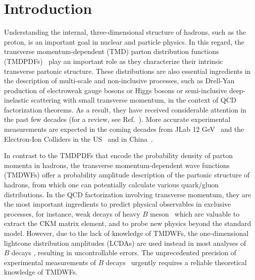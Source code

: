 \documentclass[prd,aps,twocolumn,preprintnumbers, showpacs, nofootinbib,superscriptaddress,notitlepage]{revtex4-1}
\begin{document}
\maketitle
\section{Introduction}

Understanding the internal, three-dimensional structure of hadrons, such as the proton, is an important goal in nuclear and particle physics. In this regard, the transverse momentum-dependent (TMD) parton distribution functions (TMDPDFs)~\cite{Collins:1981uk,Collins:1981va} play an important role as they characterize their intrinsic transverse 
partonic structure. These distributions are also essential ingredients in the description of multi-scale and non-inclusive processes, such as Drell-Yan production of electroweak gauge bosons or Higgs bosons or semi-inclusive deep-inelastic scattering with small transverse momentum, in the context of QCD factorization theorems. As a result, they have received considerable attention in the past few decades (for a review, see Ref.~\cite{Angeles-Martinez:2015sea}). More accurate experimental measurements are expected in the coming decades from JLab 12 GeV~\cite{Dudek:2012vr} and the Electron-Ion Colliders in the US~\cite{Accardi:2012qut,AbdulKhalek:2021gbh} and in China~\cite{Anderle:2021wcy}.


In contrast to the TMDPDFs that encode the probability density of parton momenta in hadrons, the transverse momentum-dependent wave functions (TMDWFs) offer a probability amplitude description of the partonic structure of hadrons, from which one can potentially calculate various quark/gluon distributions. In the QCD factorization involving transverse momentum, they are the most important ingredients to predict physical observables in exclusive processes, for instance, weak decays of heavy $B$ meson~\cite{Keum:2000wi,Lu:2000em} which are valuable to extract the CKM matrix element, and to probe new physics beyond the standard model. However, due to the lack of  knowledge of TMDWFs, the one-dimensional lightcone distribution amplitudes (LCDAs) are used instead in most analyses of $B$ decays \cite{Keum:2000wi,Lu:2000em,Nagashima:2002ia}, resulting in uncontrollable errors.  The unprecedented  precision of experimental measurements  of $B$ decays~\cite{Cerri:2018ypt} urgently requires a reliable theoretical  knowledge of TMDWFs. 
\end{document}
